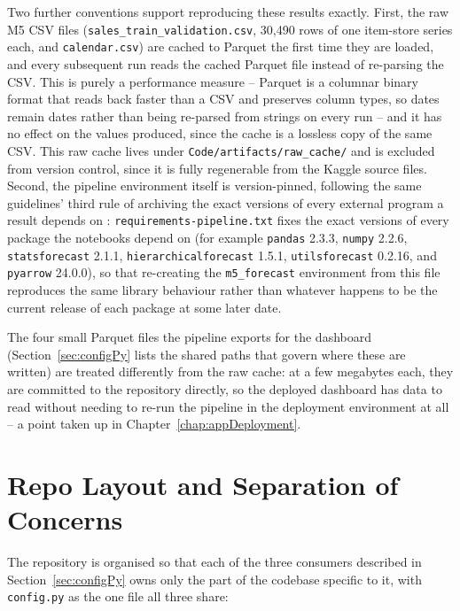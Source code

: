 Two further conventions support reproducing these results exactly. First, the raw M5 CSV files (\texttt{sales\_train\_validation.csv}, 30,490 rows of one item-store series each, and \texttt{calendar.csv}) are cached to Parquet the first time they are loaded, and every subsequent run reads the cached Parquet file instead of re-parsing the CSV. This is purely a performance measure -- Parquet is a columnar binary format that reads back faster than a CSV and preserves column types, so dates remain dates rather than being re-parsed from strings on every run -- and it has no effect on the values produced, since the cache is a lossless copy of the same CSV. This raw cache lives under \texttt{Code/artifacts/raw\_cache/} and is excluded from version control, since it is fully regenerable from the Kaggle source files. Second, the pipeline environment itself is version-pinned, following the same guidelines' third rule of archiving the exact versions of every external program a result depends on \cite{Sandve:2013}: \texttt{requirements-pipeline.txt} fixes the exact versions of every package the notebooks depend on (for example \texttt{pandas} 2.3.3, \texttt{numpy} 2.2.6, \texttt{statsforecast} 2.1.1, \texttt{hierarchicalforecast} 1.5.1, \texttt{utilsforecast} 0.2.16, and \texttt{pyarrow} 24.0.0), so that re-creating the \texttt{m5\_forecast} environment from this file reproduces the same library behaviour rather than whatever happens to be the current release of each package at some later date.

The four small Parquet files the pipeline exports for the dashboard (Section~\ref{sec:configPy} lists the shared paths that govern where these are written) are treated differently from the raw cache: at a few megabytes each, they are committed to the repository directly, so the deployed dashboard has data to read without needing to re-run the pipeline in the deployment environment at all -- a point taken up in Chapter~\ref{chap:appDeployment}.

\section{Repo Layout and Separation of Concerns}
\label{sec:repoLayout}

The repository is organised so that each of the three consumers described in Section~\ref{sec:configPy} owns only the part of the codebase specific to it, with \texttt{config.py} as the one file all three share:

